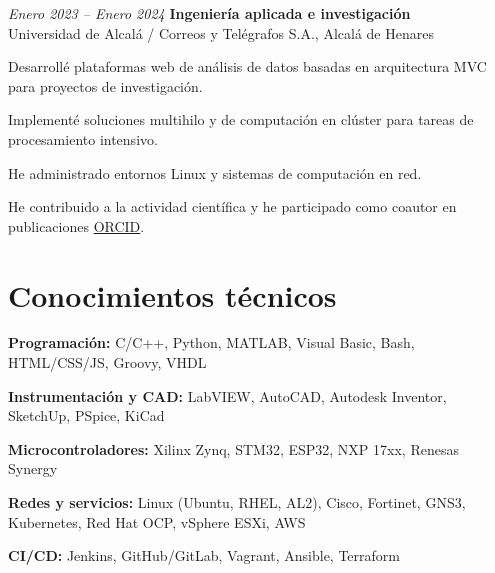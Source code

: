 \vspace{0.2 cm}

\begin{twocolentry}{\textit{Enero 2023 -- Enero 2024}}
	\textbf{Ingeniería aplicada e investigación} \\
	Universidad de Alcalá / Correos y Telégrafos S.A., Alcalá de Henares
\end{twocolentry}
\begin{onecolentry}
	\begin{highlights}
		\item Desarrollé plataformas web de análisis de datos basadas en arquitectura MVC para proyectos de investigación.
		\item Implementé soluciones multihilo y de computación en clúster para tareas de procesamiento intensivo.
		\item He administrado entornos Linux y sistemas de computación en red.
		\item He contribuido a la actividad científica y he participado como coautor en publicaciones \href{https://orcid.org/0009-0000-6862-1872}{ORCID}.
	\end{highlights}
\end{onecolentry}

\vspace{-7pt}

\section{Conocimientos técnicos}

\begin{onecolentry}
	\textbf{Programación:} C/C++, Python, MATLAB, Visual Basic, Bash, HTML/CSS/JS, Groovy, VHDL
\end{onecolentry}
\begin{onecolentry}
	\textbf{Instrumentación y CAD:} LabVIEW, AutoCAD, Autodesk Inventor, SketchUp, PSpice, KiCad
\end{onecolentry}
\begin{onecolentry}
	\textbf{Microcontroladores:} Xilinx Zynq, STM32, ESP32, NXP 17xx, Renesas Synergy
\end{onecolentry}
\begin{onecolentry}
	\textbf{Redes y servicios:} Linux (Ubuntu, RHEL, AL2), Cisco, Fortinet, GNS3, Kubernetes, Red Hat OCP, vSphere ESXi, AWS
\end{onecolentry}
\begin{onecolentry}
	\textbf{CI/CD:} Jenkins, GitHub/GitLab, Vagrant, Ansible, Terraform
\end{onecolentry}